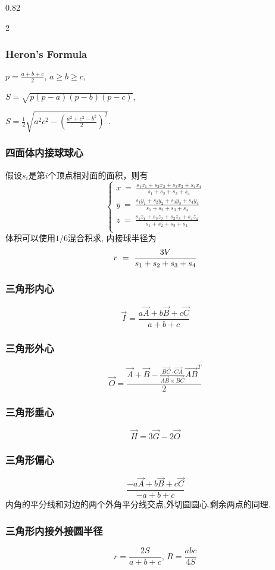 \begin{small}
\begin{spacing}{0.82}
\begin{multicols*}{2}
	\subsubsection*{Heron's Formula}
	$p=\frac{a+b+c}{2}$, $a \geq b \geq c$, 

	$S=\sqrt{p(p-a)(p-b)(p-c)}$,

	$S=\frac{1}{2}\sqrt{a^2 c^2 - \left( \frac{a^2 + c^2 - b^2}{2} \right)^2}$.

\subsubsection*{四面体内接球球心}
假设$s_i$是第$i$个顶点相对面的面积，则有
\[\left\{
\begin{aligned}
x \ = \ \frac{s_1x_1+s_2x_2+s_3x_3+s_4x_4}{s_1+s_2+s_3+s_4}\\
y \ = \ \frac{s_1y_1+s_2y_2+s_3y_3+s_4y_4}{s_1+s_2+s_3+s_4}\\
z \ = \ \frac{s_1z_1+s_2z_2+s_3z_3+s_4z_4}{s_1+s_2+s_3+s_4}\\
\end{aligned}\right.\]
体积可以使用$1/6$混合积求, 内接球半径为
\[
r \ = \ \frac{3V}{s_1+s_2+s_3+s_4} \\
\]
\subsubsection*{三角形内心}
	\[ \vec{I} = \frac{a\vec {A} + b\vec{B} + c\vec{C}}{a + b + c} \]
\subsubsection*{三角形外心}
	\[ \vec{O} = \frac{\vec{A} + \vec{B} - \frac{\overrightarrow {BC} \cdot \overrightarrow{CA}}{\overrightarrow {AB} \times \overrightarrow{BC}}\overrightarrow {AB}^T}{2} \]
\subsubsection*{三角形垂心}
	\[ \vec{H} = 3\vec{G} - 2\vec{O} \]
\subsubsection*{三角形偏心}
	\[ \frac{-a\vec {A} + b\vec{B} + c\vec{C}}{-a + b + c} \]
	内角的平分线和对边的两个外角平分线交点,外切圆圆心.剩余两点的同理. 
\subsubsection*{三角形内接外接圆半径}
	\[ r=\frac{2S}{a+b+c},\, R=\frac{abc}{4S} \]

\end{multicols*}
\end{spacing}
\end{small}
